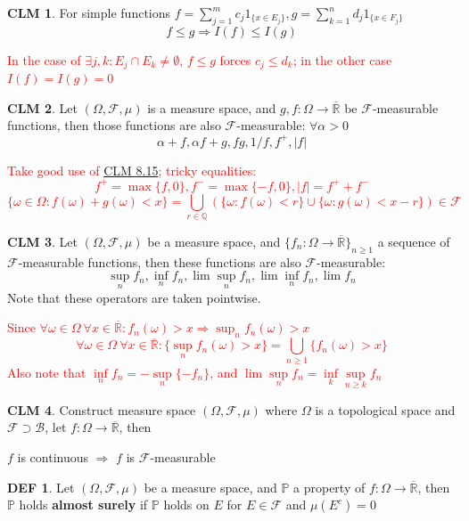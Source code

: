 \documentclass[hidelinks]{article}
\theoremstyle{definition}
\newtheorem*{defin}{DEF}
\theoremstyle{dotless}
\newtheorem{claim}{CLM}[section]
\theoremstyle{remark}
\begin{document}
\begin{claim}\label{CLM 8.16}
For simple functions $f=\sum\limits_{j=1}^mc_j1_{\{x\in E_j\}},g=\sum\limits_{k=1}^nd_j1_{\{x\in F_j\}}$
\[f\leq g\Rightarrow I(f)\leq I(g)\]
\end{claim}
\textcolor{red}{In the case of $\exists j,k:E_j\cap E_k\neq\emptyset$, $f\leq g$ forces $c_j\leq d_k$; in the other case $I(f)=I(g)=0$}

\begin{claim}
Let $(\Omega,\mathscr{F},\mu)$ is a measure space, and $g,f:\Omega\to\overline{\mathbb{R}}$ be $\mathscr{F}$-measurable functions, then those functions are also $\mathscr{F}$-measurable: $\forall\alpha>0$
\[\alpha+f,\alpha f+g,fg,1/f,f^+,|f|\]
\end{claim}
\textcolor{red}{Take good use of \hyperref[CLM 8.15]{CLM 8.15}; tricky equalities:
\[f^+=\max\{f,0\},f^-=\max\{-f,0\},|f|=f^++f^-\]
\[\{\omega\in\Omega:f(\omega)+g(\omega)<x\}=\bigcup_{r\in\mathbb{Q}}(\{\omega:f(\omega)<r\}\cup\{\omega:g(\omega)<x-r\})\in\mathscr{F}\]}

\begin{claim}
Let $(\Omega,\mathscr{F},\mu)$ be a measure space, and $\{f_n:\Omega\to\overline{\mathbb{R}}\}_{n\geq1}$ a sequence of $\mathscr{F}$-measurable functions, then these functions are also $\mathscr{F}$-measurable:
\[\sup_nf_n,\inf_nf_n,\lim\sup_nf_n,\lim\inf_nf_n,\lim f_n\]
Note that these operators are taken pointwise.
\end{claim}
\textcolor{red}{Since $\forall\omega\in\Omega\ \forall x\in\overline{\mathbb{R}}:f_n(\omega)>x\Rightarrow\sup_nf_n(\omega)>x$
\[\forall\omega\in\Omega\ \forall x\in\overline{\mathbb{R}}:\{\sup_nf_n(\omega)>x\}=\bigcup_{n\geq1}\{f_n(\omega)>x\}\]
Also note that $\inf\limits_nf_n=-\sup\limits_n\{-f_n\}$, and $\lim\sup\limits_nf_n=\inf\limits_k\sup\limits_{n\geq k}f_n$}

\begin{claim}
Construct measure space $(\Omega,\mathscr{F},\mu)$ where $\Omega$ is a topological space and $\mathscr{F}\supset\mathscr{B}$, let $f:\Omega\to\overline{\mathbb{R}}$, then
\begin{center}$f$ is continuous $\Rightarrow$ $f$ is $\mathscr{F}$-measurable\end{center}
\end{claim}

\begin{defin}
Let $(\Omega,\mathscr{F},\mu)$ be a measure space, and $\mathbb{P}$ a property of $f:\Omega\to\overline{\mathbb{R}}$, then $\mathbb{P}$ holds \textbf{almost surely} if $\mathbb{P}$ holds on $E$ for $E\in\mathscr{F}$ and $\mu(E^c)=0$
\end{defin}
\end{document}
